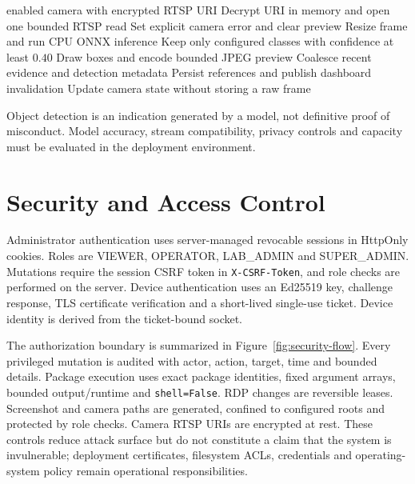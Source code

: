 \documentclass[12pt,a4paper]{report}
\begin{document}
\begin{algorithm}[H]
\caption{Camera frame processing}
\label{alg:camera}
\begin{algorithmic}[1]
\Require enabled camera with encrypted RTSP URI
\State Decrypt URI in memory and open one bounded RTSP read
  \State Set explicit camera error and clear preview
\Else
  \State Resize frame and run CPU ONNX inference
  \State Keep only configured classes with confidence at least \(0.40\)
    \State Draw boxes and encode bounded JPEG preview
    \State Coalesce recent evidence and detection metadata
    \State Persist references and publish dashboard invalidation
  \Else
    \State Update camera state without storing a raw frame
  \EndIf
\EndIf
\end{algorithmic}
\end{algorithm}

Object detection is an indication generated by a model, not definitive proof
of misconduct. Model accuracy, stream compatibility, privacy controls and
capacity must be evaluated in the deployment environment.

\section{Security and Access Control}
Administrator authentication uses server-managed revocable sessions in
HttpOnly cookies. Roles are VIEWER, OPERATOR, LAB\_ADMIN and SUPER\_ADMIN.
Mutations require the session CSRF token in \texttt{X-CSRF-Token}, and role
checks are performed on the server. Device authentication uses an Ed25519
key, challenge response, TLS certificate verification and a short-lived
single-use ticket. Device identity is derived from the ticket-bound socket.

The authorization boundary is summarized in Figure~\ref{fig:security-flow}.
Every privileged mutation is audited with actor, action, target, time and
bounded details. Package execution uses exact package identities, fixed
argument arrays, bounded output/runtime and \texttt{shell=False}. RDP changes
are reversible leases. Screenshot and camera paths are generated, confined
to configured roots and protected by role checks. Camera RTSP URIs are
encrypted at rest. These controls reduce attack surface but do not constitute
a claim that the system is invulnerable; deployment certificates, filesystem
ACLs, credentials and operating-system policy remain operational
responsibilities.
\end{document}
